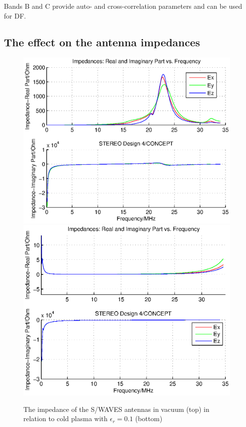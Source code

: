 \documentclass[a4paper,11pt]{article}
\begin{document}
Bands B and C provide auto- and cross-correlation parameters and can be used
for DF.\\



\subsection{The effect on the antenna impedances}

\begin{figure}
\begin{center}
  \includegraphics[width=11.5cm]{impedance_stereo_vac.eps}
\includegraphics[width=11.5cm]{impedance_stereo_pl.eps}
  \caption{The impedance of the S/WAVES antennas in vacuum (top) in relation to cold plasma with $\epsilon_r=0.1$ (bottom)}\label{fig:imp_stereo}
  \end{center}
\end{figure}
\end{document}
